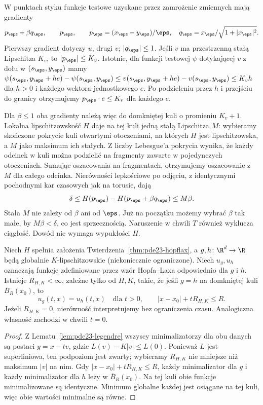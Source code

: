 \begin{uwaga}
W punktach styku funkcje testowe uzyskane
przez zamrożenie zmiennych mają gradienty
\[
 p_\eps+\beta q_\eps,\qquad p_\eps,\qquad
 p_\eps=(x_\eps-y_\eps)/\eps,\quad
 q_\eps=x_\eps/\sqrt{1+|x_\eps|^2}.
\]
Pierwszy gradient dotyczy $u$, drugi $v$;
$|q_\eps|\le1$. Jeśli $v$ ma przestrzenną
stałą Lipschitza $K_v$, to $|p_\eps|\le K_v$.
Istotnie, dla funkcji testowej $\psi$ dotykającej
$v$ z dołu w $(s_\eps,y_\eps)$ mamy
$\psi(s_\eps,y_\eps+he)-\psi(s_\eps,y_\eps)
\le v(s_\eps,y_\eps+he)-v(s_\eps,y_\eps)\le K_v h$
dla $h>0$ i każdego wektora jednostkowego $e$.
Po podzieleniu przez $h$ i przejściu do granicy
otrzymujemy $p_\eps\cdot e\le K_v$ dla każdego $e$.

Dla $\beta\le1$ oba gradienty należą więc
do domkniętej kuli o promieniu $K_v+1$.
Lokalna lipschitzowskość $H$ daje na tej kuli
jedną stałą Lipschitza $M$: wybieramy skończone
pokrycie kuli otwartymi otoczeniami, na których
$H$ jest lipschitzowska, a $M$ jako maksimum
ich stałych. Z liczby Lebesgue'a pokrycia
wynika, że każdy odcinek w kuli można podzielić
na fragmenty zawarte w pojedynczych otoczeniach.
Sumując oszacowania na fragmentach, otrzymujemy
oszacowanie z $M$ dla całego odcinka. Nierówności lepkościowe
po odjęciu, z identycznymi pochodnymi kar
czasowych jak na torusie, dają
\[
 \delta\le H(p_\eps)-H(p_\eps+\beta q_\eps)
 \le M\beta.
\]
Stała $M$ nie zależy od $\beta$ ani od $\eps$.
Już na początku możemy wybrać $\beta$ tak małe,
by $M\beta<\delta$, co jest sprzecznością.
Naruszenie w chwili $T$ również wyklucza
ciągłość. Dowód nie wymaga wypukłości $H$.
\end{uwaga}


\begin{wniosek}
\label{cor:pde23-hopflax-local}
Niech $H$ spełnia założenia Twierdzenia~\ref{thm:pde23-hopflax},
a $g,h\colon\R^d\to\R$ będą globalnie
$K$-lipschitzowskie (niekoniecznie ograniczone). Niech $u_g,u_h$ oznaczają funkcje
zdefiniowane przez wzór Hopfa--Laxa odpowiednio dla $g$ i $h$.
Istnieje $R_{H,K}<\infty$, zależne tylko od $H,K$, takie, że
jeśli $g=h$ na domkniętej kuli $\overline B_R(x_0)$, to
\[
 u_g(t,x)=u_h(t,x)
 \quad\text{dla }t>0,\qquad |x-x_0|+tR_{H,K}\le R.
\]
Jeżeli $R_{H,K}=0$, nierówność interpretujemy bez
ograniczenia czasu. Analogiczna własność zachodzi w chwili $t=0$.
\end{wniosek}
\begin{proof}
Z Lematu~\ref{lem:pde23-legendre} wszyscy minimalizatorzy
dla obu danych są postaci $y=x-tv$, gdzie
$L(v)-K|v|\le L(0)$. Ponieważ $L$ jest superliniowa,
ten podpoziom jest zwarty; wybieramy $R_{H,K}$ nie mniejsze
niż maksimum $|v|$ na nim. Gdy
$|x-x_0|+tR_{H,K}\le R$, każdy minimalizator dla $g$
i każdy minimalizator dla $h$ leży w $\overline B_R(x_0)$.
Na tej kuli obie funkcje minimalizowane są identyczne.
Minimum globalne każdej jest osiągane na tej kuli,
więc obie wartości minimalne są równe.
\end{proof}


